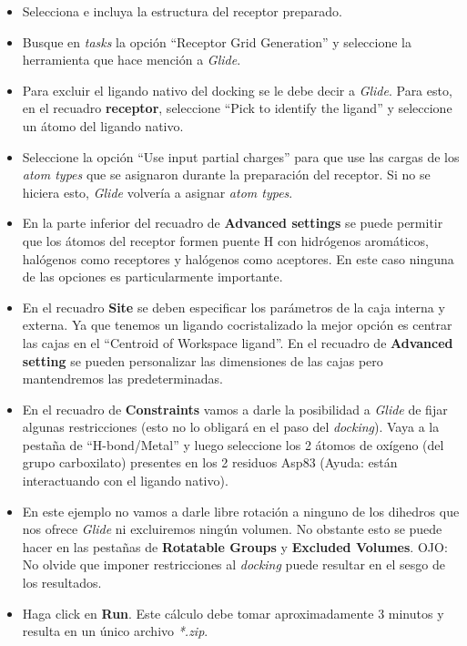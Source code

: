 \documentclass{article}
\begin{document}
\begin{itemize}
    \item Selecciona e incluya la estructura del receptor preparado.
    \item Busque en \emph{tasks} la opción ``Receptor Grid Generation'' y seleccione la herramienta que hace mención a \emph{Glide}.
    \item Para excluir el ligando nativo del docking se le debe decir a \emph{Glide}. Para esto, en el recuadro \textbf{receptor}, seleccione ``Pick to identify the ligand'' y seleccione un átomo del ligando nativo.
    \item Seleccione la opción ``Use input partial charges'' para que use las cargas de los \emph{atom types} que se asignaron durante la preparación del receptor. Si no se hiciera esto, \emph{Glide} volvería a asignar \emph{atom types}.
    \item En la parte inferior del recuadro de \textbf{Advanced settings} se puede permitir que los átomos del receptor formen puente H con hidrógenos aromáticos, halógenos como receptores y halógenos como aceptores. En este caso ninguna de las opciones es particularmente importante.
    \item En el recuadro \textbf{Site} se deben especificar los parámetros de la caja interna y externa. Ya que tenemos un ligando cocristalizado la mejor opción es centrar las cajas en el ``Centroid of Workspace ligand''. En el recuadro de \textbf{Advanced setting} se pueden personalizar las dimensiones de las cajas pero mantendremos las predeterminadas.
    \item En el recuadro de \textbf{Constraints} vamos a darle la posibilidad a \emph{Glide} de fijar algunas restricciones (esto no lo obligará en el paso del \emph{docking}). Vaya a la pestaña de ``H-bond/Metal'' y luego seleccione los 2 átomos de oxígeno (del grupo carboxilato) presentes en los 2 residuos Asp83 (Ayuda: están interactuando con el ligando nativo).
    \item En este ejemplo no vamos a darle libre rotación a ninguno de los dihedros que nos ofrece \emph{Glide} ni excluiremos ningún volumen. No obstante esto se puede hacer en las pestañas de \textbf{Rotatable Groups} y \textbf{Excluded Volumes}. OJO: No olvide que imponer restricciones al \emph{docking} puede resultar en el sesgo de los resultados.
    \item Haga click en \textbf{Run}. Este cálculo debe tomar aproximadamente 3 minutos y resulta en un único archivo \emph{*.zip}.
    
\end{itemize}
\end{document}
